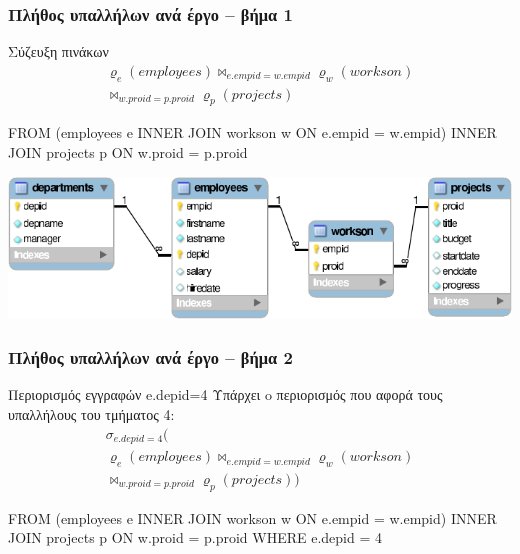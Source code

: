 \begin{frame}
\frametitle{Πλήθος υπαλλήλων ανά έργο -- βήμα 1}
\begin{minipage}{\wE}
\vspace{-0.5cm}
\begin{block}{\small Σύζευξη πινάκων}
\[
  \begin{split}
      \varrho_{e} (employees) \bowtie_{e.empid=w.empid} \varrho_{w} (workson)  \\
                              \bowtie_{w.proid=p.proid} \varrho_{p} (projects)
  \end{split}
\]
\vspace{-0.5cm}
\pause
\en
\begin{SQL}
    FROM (employees e INNER JOIN workson w
                         ON e.empid = w.empid)
                      INNER JOIN projects p
                         ON w.proid = p.proid
\end{SQL}
\el
\end{block}
\includegraphics[scale=0.9]{../common/companyREL.pdf}
\end{minipage}
\end{frame}


\begin{frame}
\frametitle{Πλήθος υπαλλήλων ανά έργο -- βήμα 2}
\begin{minipage}{\wE}
\vspace{-0.5cm}
\begin{block}{\small Περιορισμός εγγραφών {\en e.depid=4}}
Υπάρχει o περιορισμός που αφορά τους υπαλλήλους του τμήματος 4:
\[
\begin{split}
    \sigma_{e.depid=4}
    (                           \\
      \varrho_{e} (employees) \bowtie_{e.empid=w.empid} \varrho_{w} (workson)  \\
                              \bowtie_{w.proid=p.proid} \varrho_{p} (projects)
    )
\end{split}
\]
\vspace*{-1em}
\pause
\en
\begin{SQL}
    FROM (employees e INNER JOIN workson w
                         ON e.empid = w.empid)
                      INNER JOIN projects p
                         ON w.proid = p.proid
   WHERE e.depid = 4
\end{SQL}
\el
\end{block}
\end{minipage}
\end{frame}


